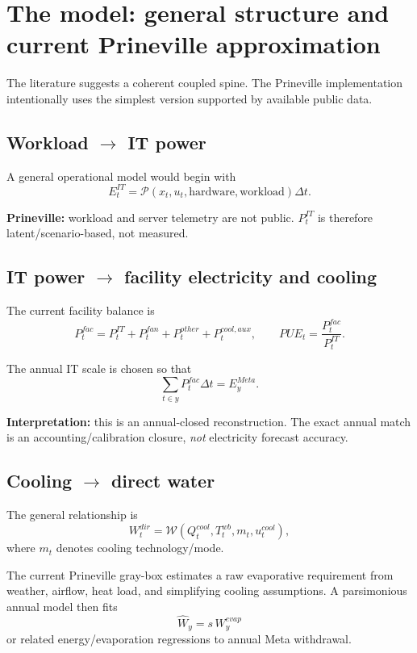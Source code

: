 \documentclass[11pt]{article}
\begin{document}
\section{The model: general structure and current Prineville approximation}

The literature suggests a coherent coupled spine. The Prineville implementation intentionally uses the simplest version supported by available public data.

\subsection{Workload \(\rightarrow\) IT power}

A general operational model would begin with
\[
E^{IT}_{t}
=
\mathcal P(x_t,u_t,\text{hardware},\text{workload})\Delta t.
\]

\textbf{Prineville:} workload and server telemetry are not public. \(P^{IT}_t\) is therefore latent/scenario-based, not measured.

\subsection{IT power \(\rightarrow\) facility electricity and cooling}

The current facility balance is
\[
P^{fac}_t
=
P^{IT}_t
+
P^{fan}_t
+
P^{other}_t
+
P^{cool,aux}_t,
\qquad
PUE_t=\frac{P^{fac}_t}{P^{IT}_t}.
\]

The annual IT scale is chosen so that
\[
\sum_{t\in y}P^{fac}_t\Delta t=E^{Meta}_y.
\]

\textbf{Interpretation:} this is an annual-closed reconstruction. The exact annual match is an accounting/calibration closure, \emph{not} electricity forecast accuracy.

\subsection{Cooling \(\rightarrow\) direct water}

The general relationship is
\[
W^{dir}_t
=
\mathcal W\!\left(Q^{cool}_t,T^{wb}_t,m_t,u^{cool}_t\right),
\]
where \(m_t\) denotes cooling technology/mode.

The current Prineville gray-box estimates a raw evaporative requirement from weather, airflow, heat load, and simplifying cooling assumptions. A parsimonious annual model then fits
\[
\widehat W_y=s\,W^{evap}_y
\]
or related energy/evaporation regressions to annual Meta withdrawal.
\end{document}
